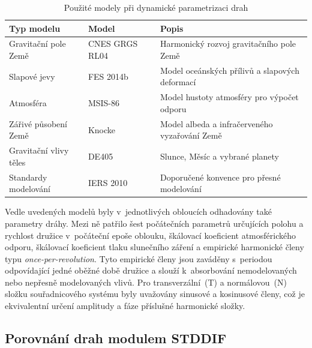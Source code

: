 \begin{table}[H]
\centering
\caption{Použité modely při dynamické parametrizaci drah}
\label{tab:bernese-models}

\renewcommand{\arraystretch}{1.2}

\begin{tabularx}{\textwidth}{
    l
    l
    >{\raggedright\arraybackslash}X
}
\toprule
\textbf{Typ modelu} & \textbf{Model} & \textbf{Popis} \\
\midrule

Gravitační pole Země & CNES GRGS RL04~\cite{lemoine_2019_rl04} &
Harmonický rozvoj gravitačního pole Země \\

Slapové jevy & FES 2014b~\cite{lyard_2021_fes2014} &
Model oceánských přílivů a slapových deformací \\

Atmosféra & MSIS-86~\cite{hedin_1987_msis86} &
Model hustoty atmosféry pro výpočet odporu \\

Zářivé působení Země & Knocke~\cite{knocke_1988_erp} &
Model albeda a infračerveného vyzařování Země \\

Gravitační vlivy těles & DE405~\cite{standish_1998_de405} &
Slunce, Měsíc a vybrané planety \\

Standardy modelování & IERS 2010~\cite{iers_2010} &
Doporučené konvence pro přesné modelování \\

\bottomrule
\end{tabularx}
\end{table}

Vedle uvedených modelů byly v~jednotlivých obloucích odhadovány také parametry dráhy. Mezi ně patřilo šest počátečních parametrů určujících polohu a rychlost družice v~počáteční epoše oblouku, škálovací koeficient atmosférického odporu, škálovací koeficient tlaku slunečního záření a empirické harmonické členy typu \textit{once-per-revolution}. Tyto empirické členy jsou zaváděny s~periodou odpovídající jedné oběžné době družice a slouží k~absorbování nemodelovaných nebo nepřesně modelovaných vlivů. Pro transverzální~(T) a normálovou~(N) složku souřadnicového systému  byly uvažovány sinusové a kosinusové členy, což je ekvivalentní určení amplitudy a fáze příslušné harmonické složky.

\subsection{Porovnání drah modulem STDDIF}

